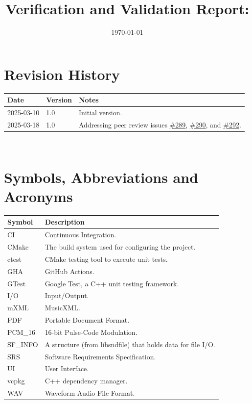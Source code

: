 \documentclass[12pt, titlepage]{article}
\begin{document}
\title{Verification and Validation Report: \progname} 
\author{\authname}
\date{\today}
	
\maketitle


\section{Revision History}

\begin{tabularx}{\textwidth}{p{3cm}p{2cm}X}
\toprule {\bf Date} & {\bf Version} & {\bf Notes}\\
\midrule
2025-03-10 & 1.0 & Initial version.\\
2025-03-18 & 1.0 & Addressing peer review issues 
  \href{https://github.com/emilyperica/ScoreGen/issues/289}{\#289}, 
  \href{https://github.com/emilyperica/ScoreGen/issues/290}{\#290}, and 
  \href{https://github.com/emilyperica/ScoreGen/issues/292}{\#292}. \\
\bottomrule
\end{tabularx}

~\newpage

\section{Symbols, Abbreviations and Acronyms}

\renewcommand{\arraystretch}{1.2}
\begin{table}[h!]
  \vspace{5pt}
  \begin{tabular}{l l} 
    \toprule		
    \textbf{Symbol} & \textbf{Description} \\
    \midrule 
    CI & Continuous Integration. \\
    CMake & The build system used for configuring the project. \\
    ctest& CMake testing tool to execute unit tests. \\
    GHA & GitHub Actions. \\
    GTest & Google Test, a C++ unit testing framework. \\
    I/O & Input/Output. \\
    mXML & MusicXML. \\
    PDF & Portable Document Format. \\
    PCM\_16 & 16-bit Pulse-Code Modulation. \\
    SF\_INFO & A structure (from libsndfile) that holds data for file I/O. \\
    SRS & Software Requirements Specification. \\
    UI & User Interface. \\
    vcpkg & C++ dependency manager. \\
    WAV & Waveform Audio File Format. \\
    \bottomrule
  \end{tabular}\\
\end{table}
\newpage
\end{document}

